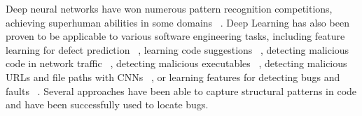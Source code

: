 \documentclass[
a4paper,
pagesize,
pdftex,
12pt,
twoside, %
BCOR=5mm, %
ngerman,
fleqn,
final,
]{scrartcl}
\begin{document}
	Deep neural networks have won numerous pattern recognition competitions, achieving superhuman abilities in some domains ~\cite{Schmidhuber.2015}. Deep Learning has also been proven to be applicable to various software engineering tasks, including feature learning for defect prediction ~\cite{Wang.2016}, learning code suggestions ~\cite{Bhoopchand.2016}, detecting malicious code in network traffic ~\cite{Elovici.2007}, detecting malicious executables ~\cite{Schultz.2000}, detecting malicious URLs and file paths with CNNs ~\cite{Saxe.2017}, or learning features for detecting bugs and faults ~\cite{Huo.2016,Gupta.2017b}. Several approaches have been able to capture structural patterns in code \cite{Dam.2016} and have been successfully used to locate bugs\cite{Huo.2016,Russell.2018}.\\
	
\end{document}
